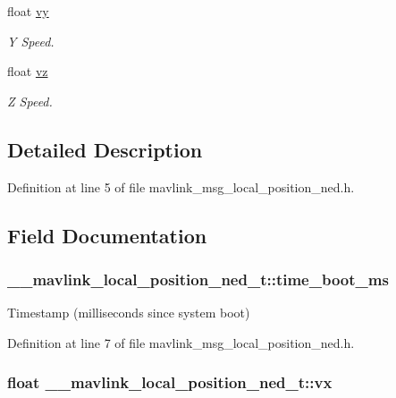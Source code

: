 \begin{DoxyCompactItemize}
float \hyperlink{struct____mavlink__local__position__ned__t_a0e9a5142819014e5807a657409608fa6}{vy}
\begin{DoxyCompactList}\small\item\em Y Speed. \end{DoxyCompactList}\item 
float \hyperlink{struct____mavlink__local__position__ned__t_aa34bbb949b0afd4bd524f455b9d980f6}{vz}
\begin{DoxyCompactList}\small\item\em Z Speed. \end{DoxyCompactList}\end{DoxyCompactItemize}


\subsection{Detailed Description}


Definition at line 5 of file mavlink\-\_\-msg\-\_\-local\-\_\-position\-\_\-ned.\-h.



\subsection{Field Documentation}
\hypertarget{struct____mavlink__local__position__ned__t_a00187442905b1327719d9fde885a9bf9}{
\subsubsection[{time\-\_\-boot\-\_\-ms}]{ \-\_\-\-\_\-mavlink\-\_\-local\-\_\-position\-\_\-ned\-\_\-t\-::time\-\_\-boot\-\_\-ms}}\label{struct____mavlink__local__position__ned__t_a00187442905b1327719d9fde885a9bf9}


Timestamp (milliseconds since system boot) 



Definition at line 7 of file mavlink\-\_\-msg\-\_\-local\-\_\-position\-\_\-ned.\-h.

\hypertarget{struct____mavlink__local__position__ned__t_a87216fec6527221da8812d77d8d84eb1}{
\subsubsection[{vx}]{\setlength{\rightskip}{0pt plus 5cm}float \-\_\-\-\_\-mavlink\-\_\-local\-\_\-position\-\_\-ned\-\_\-t\-::vx}}\label{struct____mavlink__local__position__ned__t_a87216fec6527221da8812d77d8d84eb1}


